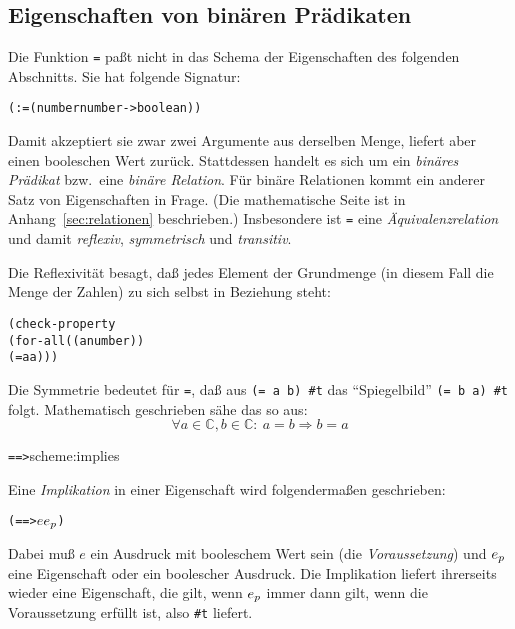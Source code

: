 \subsection{Eigenschaften von binären Prädikaten}

Die Funktion \texttt{=} paßt nicht in das Schema der Eigenschaften
des folgenden Abschnitts.  Sie hat folgende Signatur:
%
\begin{alltt}
(: = (number number -> boolean))
\end{alltt}
%
Damit akzeptiert sie zwar zwei Argumente aus derselben Menge, liefert
aber einen booleschen Wert zurück.  Stattdessen handelt es sich um ein
\textit{binäres Prädikat} bzw.\ eine \textit{binäre
  Relation}.  Für binäre
Relationen kommt ein anderer Satz von Eigenschaften in Frage.  (Die
mathematische Seite ist in Anhang~\ref{sec:relationen} beschrieben.)
Insbesondere ist \texttt{=} eine
\textit{Äquivalenzrelation} und damit
\textit{reflexiv},
\textit{symmetrisch} und
\textit{transitiv}.

Die Reflexivität besagt, daß jedes Element der Grundmenge (in diesem
Fall die Menge der Zahlen) zu sich selbst in Beziehung steht:
%
\begin{alltt}
(check-property
 (for-all ((a number))
   (= a a)))
\end{alltt}
%
Die Symmetrie bedeutet für \texttt{=}, daß aus \texttt{(= a b)
  \evalsto{} \#t} das "`Spiegelbild"' \texttt{(= b a) \evalsto{} \#t}
folgt.  Mathematisch geschrieben sähe das so aus:
%
\begin{displaymath}
  \forall a \in \mathbb{C}, b\in\mathbb{C}:\ a = b \Rightarrow b = a
\end{displaymath}
%
\begin{feature}{\texttt{==>}}{scheme:implies}

Eine \textit{Implikation} in einer Eigenschaft wird
folgendermaßen geschrieben:
\begin{alltt}
(==> \(e\) \(e\sb{p}\))
\end{alltt}
%
Dabei muß $e$ ein Ausdruck mit booleschem Wert sein (die
\textit{Voraussetzung}) und \(e\sb{p}\) eine Eigenschaft oder ein
boolescher Ausdruck.  Die Implikation liefert ihrerseits wieder eine
Eigenschaft, die gilt, wenn \(e\sb{p}\) immer dann gilt, wenn die
Voraussetzung erfüllt ist, also \verb|#t| liefert.
\end{feature}

